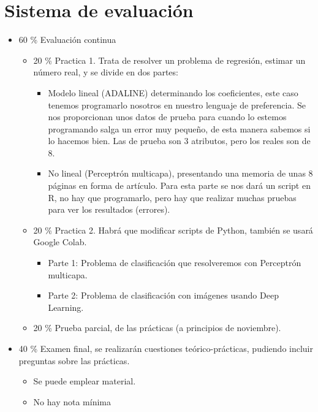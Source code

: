 \documentclass[12pt, twoside, openright]{report} %
\begin{document}
\section{Sistema de evaluación}
\begin{itemize}
	\item 60 \% Evaluación continua
	      \begin{itemize}
		      \item 20 \% Practica 1. Trata de resolver un problema de regresión, estimar un número real, y se divide en dos partes:
		            \begin{itemize}
			            \item  Modelo lineal (ADALINE) determinando los coeficientes, este caso tenemos programarlo nosotros en nuestro lenguaje de preferencia.
			                  Se nos proporcionan unos datos de prueba para cuando lo estemos programando salga un error muy pequeño, de esta manera sabemos si lo hacemos bien. Las de prueba son 3 atributos, pero los reales son de 8.
			            \item  No lineal (Perceptrón multicapa), presentando una memoria de unas 8 páginas en forma de artículo.
			                  Para esta parte se nos dará un script en R, no hay que programarlo, pero hay que realizar muchas pruebas para ver los resultados (errores).
		            \end{itemize}
		      \item 20 \% Practica 2. Habrá que modificar scripts de Python, también se usará Google Colab.
		            \begin{itemize}
			            \item Parte 1: Problema de clasificación que resolveremos con Perceptrón multicapa.
			            \item Parte 2: Problema de clasificación con imágenes usando Deep Learning.
		            \end{itemize}
		      \item 20 \% Prueba parcial, de las prácticas (a principios de noviembre).
	      \end{itemize}
	\item 40 \% Examen final, se realizarán cuestiones teórico-prácticas, pudiendo incluir preguntas sobre las prácticas.
	      \begin{itemize}
		      \item Se puede emplear material.
		      \item No hay nota mínima
	      \end{itemize}
\end{itemize}
\end{document}
